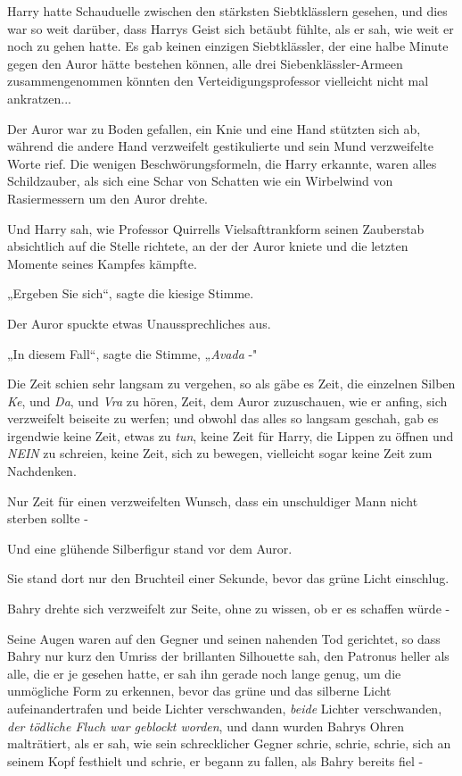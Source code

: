 {Harry hatte Schauduelle zwischen den stärksten Siebtklässlern gesehen, und dies war so weit darüber, dass Harrys Geist sich betäubt fühlte, als er sah, wie weit er noch zu gehen hatte. Es gab keinen einzigen Siebtklässler, der eine halbe Minute gegen den Auror hätte bestehen können, alle drei Siebenklässler-Armeen zusammengenommen könnten den Verteidigungsprofessor vielleicht nicht mal ankratzen...

Der Auror war zu Boden gefallen, ein Knie und eine Hand stützten sich ab, während die andere Hand verzweifelt gestikulierte und sein Mund verzweifelte Worte rief. Die wenigen Beschwörungsformeln, die Harry erkannte, waren alles Schildzauber, als sich eine Schar von Schatten wie ein Wirbelwind von Rasiermessern um den Auror drehte.

Und Harry sah, wie Professor Quirrells Vielsafttrankform seinen Zauberstab absichtlich auf die Stelle richtete, an der der Auror kniete und die letzten Momente seines Kampfes kämpfte.

„Ergeben Sie sich“, sagte die kiesige Stimme.

Der Auror spuckte etwas Unaussprechliches aus.

„In diesem Fall“, sagte die Stimme, „\emph{Avada} -"

Die Zeit schien sehr langsam zu vergehen, so als gäbe es Zeit, die einzelnen Silben \emph{Ke}, und \emph{Da}, und \emph{Vra} zu hören, Zeit, dem Auror zuzuschauen, wie er anfing, sich verzweifelt beiseite zu werfen; und obwohl das alles so langsam geschah, gab es irgendwie keine Zeit, etwas zu \emph{tun}, keine Zeit für Harry, die Lippen zu öffnen und \emph{NEIN} zu schreien, keine Zeit, sich zu bewegen, vielleicht sogar keine Zeit zum Nachdenken.

Nur Zeit für einen verzweifelten Wunsch, dass ein unschuldiger Mann nicht sterben sollte -

Und eine glühende Silberfigur stand vor dem Auror.

Sie stand dort nur den Bruchteil einer Sekunde, bevor das grüne Licht einschlug.

Bahry drehte sich verzweifelt zur Seite, ohne zu wissen, ob er es schaffen würde -

Seine Augen waren auf den Gegner und seinen nahenden Tod gerichtet, so dass Bahry nur kurz den Umriss der brillanten Silhouette sah, den Patronus heller als alle, die er je gesehen hatte, er sah ihn gerade noch lange genug, um die unmögliche Form zu erkennen, bevor das grüne und das silberne Licht aufeinandertrafen und beide Lichter verschwanden, \emph{beide} Lichter verschwanden, \emph{der tödliche Fluch war geblockt worden}, und dann wurden Bahrys Ohren malträtiert, als er sah, wie sein schrecklicher Gegner schrie, schrie, schrie, sich an seinem Kopf festhielt und schrie, er begann zu fallen, als Bahry bereits fiel -

}
